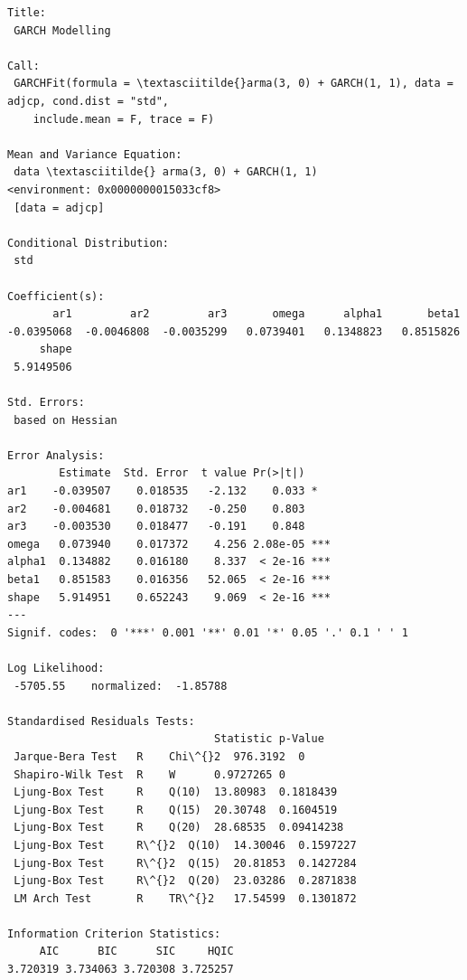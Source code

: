 \documentclass[11pt]{article}
\begin{document}
\begin{Verbatim}[commandchars=\\\{\}]
Title:
 GARCH Modelling

Call:
 GARCHFit(formula = \textasciitilde{}arma(3, 0) + GARCH(1, 1), data = adjcp, cond.dist = "std",
    include.mean = F, trace = F)

Mean and Variance Equation:
 data \textasciitilde{} arma(3, 0) + GARCH(1, 1)
<environment: 0x0000000015033cf8>
 [data = adjcp]

Conditional Distribution:
 std

Coefficient(s):
       ar1         ar2         ar3       omega      alpha1       beta1
-0.0395068  -0.0046808  -0.0035299   0.0739401   0.1348823   0.8515826
     shape
 5.9149506

Std. Errors:
 based on Hessian

Error Analysis:
        Estimate  Std. Error  t value Pr(>|t|)
ar1    -0.039507    0.018535   -2.132    0.033 *
ar2    -0.004681    0.018732   -0.250    0.803
ar3    -0.003530    0.018477   -0.191    0.848
omega   0.073940    0.017372    4.256 2.08e-05 ***
alpha1  0.134882    0.016180    8.337  < 2e-16 ***
beta1   0.851583    0.016356   52.065  < 2e-16 ***
shape   5.914951    0.652243    9.069  < 2e-16 ***
---
Signif. codes:  0 '***' 0.001 '**' 0.01 '*' 0.05 '.' 0.1 ' ' 1

Log Likelihood:
 -5705.55    normalized:  -1.85788

Standardised Residuals Tests:
                                Statistic p-Value
 Jarque-Bera Test   R    Chi\^{}2  976.3192  0
 Shapiro-Wilk Test  R    W      0.9727265 0
 Ljung-Box Test     R    Q(10)  13.80983  0.1818439
 Ljung-Box Test     R    Q(15)  20.30748  0.1604519
 Ljung-Box Test     R    Q(20)  28.68535  0.09414238
 Ljung-Box Test     R\^{}2  Q(10)  14.30046  0.1597227
 Ljung-Box Test     R\^{}2  Q(15)  20.81853  0.1427284
 Ljung-Box Test     R\^{}2  Q(20)  23.03286  0.2871838
 LM Arch Test       R    TR\^{}2   17.54599  0.1301872

Information Criterion Statistics:
     AIC      BIC      SIC     HQIC
3.720319 3.734063 3.720308 3.725257

    \end{Verbatim}
\end{document}
